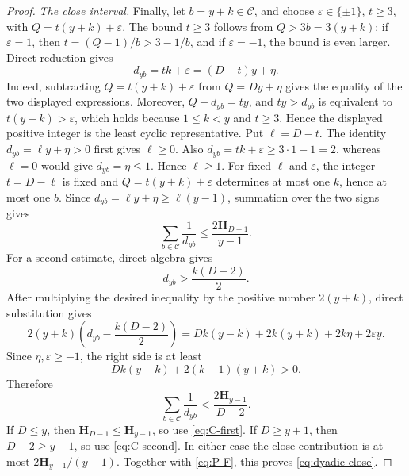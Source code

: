 \documentclass[10pt,a4paper]{amsart}
\newcommand{\Harm}{\mathbf H}
\begin{document}
\begin{proof}
\smallskip
\noindent\emph{The close interval.}
Finally, let \(b=y+k\in\mathcal C\), and choose
\(\varepsilon\in\{\pm1\}\), \(t\ge3\), with
\(Q=t(y+k)+\varepsilon\).  The bound \(t\ge3\) follows from
\(Q>3b=3(y+k)\): if \(\varepsilon=1\), then
\(t=(Q-1)/b>3-1/b\), and if \(\varepsilon=-1\), the bound is even
larger.  Direct reduction gives
\[
 d_{yb}=tk+\varepsilon=(D-t)y+\eta.
\]
Indeed, subtracting \(Q=t(y+k)+\varepsilon\) from
\(Q=Dy+\eta\) gives the equality of the two displayed expressions.
Moreover, \(Q-d_{yb}=ty\), and
\(ty>d_{yb}\) is equivalent to \(t(y-k)>\varepsilon\), which holds
because \(1\le k<y\) and \(t\ge3\).  Hence the displayed positive
integer is the least cyclic representative.  Put \(\ell=D-t\).  The
identity \(d_{yb}=\ell y+\eta>0\) first gives \(\ell\ge0\).  Also
\(d_{yb}=tk+\varepsilon\ge3\cdot1-1=2\), whereas \(\ell=0\) would give
\(d_{yb}=\eta\le1\).  Hence \(\ell\ge1\).
For fixed \(\ell\) and \(\varepsilon\), the integer \(t=D-\ell\) is
fixed and \(Q=t(y+k)+\varepsilon\) determines at most one \(k\), hence at
most one \(b\).  Since \(d_{yb}=\ell y+\eta\ge\ell(y-1)\), summation over
the two signs gives
\begin{equation}\label{eq:C-first}
 \sum_{b\in\mathcal C}\frac1{d_{yb}}
 \le\frac{2\Harm_{D-1}}{y-1}.
\end{equation}
For a second estimate, direct algebra gives
\[
 d_{yb}>\frac{k(D-2)}2.
\]
After multiplying the desired inequality by the positive number
\(2(y+k)\), direct substitution gives
\[
 2(y+k)\left(d_{yb}-\frac{k(D-2)}2\right)
 =Dk(y-k)+2k(y+k)+2k\eta+2\varepsilon y.
\]
Since \(\eta,\varepsilon\ge-1\), the right side is at least
\[
 Dk(y-k)+2(k-1)(y+k)>0.
\]
Therefore
\begin{equation}\label{eq:C-second}
 \sum_{b\in\mathcal C}\frac1{d_{yb}}
 <\frac{2\Harm_{y-1}}{D-2}.
\end{equation}
If \(D\le y\), then \(\Harm_{D-1}\le\Harm_{y-1}\), so use
\eqref{eq:C-first}.  If \(D\ge y+1\), then \(D-2\ge y-1\), so use
\eqref{eq:C-second}.  In either case the close contribution is at most
\(2\Harm_{y-1}/(y-1)\).  Together with
\eqref{eq:P-F}, this proves \eqref{eq:dyadic-close}.
\end{proof}
\end{document}
